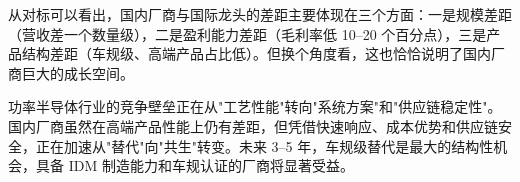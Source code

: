 从对标可以看出，国内厂商与国际龙头的差距主要体现在三个方面：一是规模差距（营收差一个数量级），二是盈利能力差距（毛利率低 10–20 个百分点），三是产品结构差距（车规级、高端产品占比低）。但换个角度看，这也恰恰说明了国内厂商巨大的成长空间。

\begin{keyinsight}[竞争格局核心判断]
功率半导体行业的竞争壁垒正在从"工艺性能"转向"系统方案"和"供应链稳定性"。国内厂商虽然在高端产品性能上仍有差距，但凭借快速响应、成本优势和供应链安全，正在加速从"替代"向"共生"转变。未来 3–5 年，车规级替代是最大的结构性机会，具备 IDM 制造能力和车规认证的厂商将显著受益。
\end{keyinsight}
